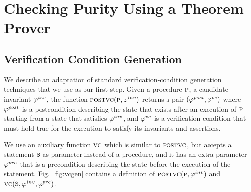 \newcommand{\existformula}{\psi^e}
\newcommand{\EA}{\textsc{ea}}
\newcommand{\IW}{\textsc{iw}}

\newcommand{\initformula}{\logicalformula{init}}

\section{Checking Purity Using a Theorem Prover}

\subsection{Verification Condition Generation}

We describe an adaptation of standard verification-condition generation techniques that we use as our first step.
Given a procedure $\textsc{p}$, a candidate invariant $\varphi^{inv}$, the function $\textsc{postvc}({\textsc{p}},{\varphi^{inv}})$ returns a
pair $(\varphi^{post},\varphi^{vc})$ where $\varphi^{post}$ is a postcondition describing the state that exists after an execution of
$\textsc{p}$ starting from a state that satisfies $\varphi^{inv}$, and $\varphi^{vc}$ is a verification-condition that must hold true
for the execution to satisfy its invariants and assertions.

We use an auxiliary function $\textsc{vc}$ which is similar to $\textsc{postvc}$, but accepts a statement $\texttt{S}$ as
parameter instead of a procedure, and it has an extra parameter $\varphi^{pre}$ that is a precondition describing
the state before the execution of the statement.
Fig.~\ref{fig:vcgen} contains a definition of $\textsc{postvc}({\textsc{p}},{\varphi^{inv}})$  and  $\textsc{vc}({\texttt{S}},{\varphi^{inv}},{\varphi^{pre}})$.

